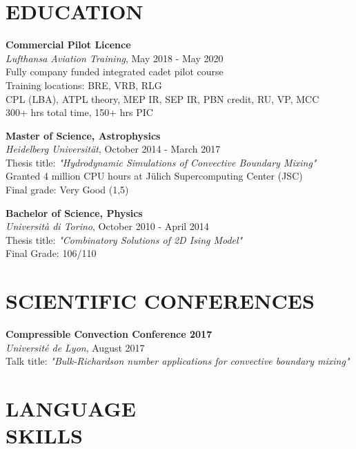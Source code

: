 \documentclass[margin]{res}
\begin{document}
\begin{resume}
\section{EDUCATION}

\textbf{Commercial Pilot Licence}\\
{\sl Lufthansa Aviation Training}, May 2018 - May 2020\\
Fully company funded integrated cadet pilot course\\
Training locations: BRE, VRB, RLG\\
CPL (LBA), ATPL theory, MEP IR, SEP IR, PBN credit, RU, VP, MCC\\
300+ hrs total time, 150+ hrs PIC

\textbf{Master of Science, Astrophysics}\\
{\sl Heidelberg Universität}, October 2014 - March 2017\\
Thesis title: \textit{"Hydrodynamic Simulations of Convective Boundary Mixing"}\\
Granted 4 million CPU hours at Jülich Supercomputing Center (JSC)\\
\hfill Final grade: Very Good (1,5)

\textbf{Bachelor of Science, Physics} \\
{\sl Università di Torino}, October 2010 - April 2014\\
Thesis title: \textit{"Combinatory Solutions of 2D Ising Model"}\\
\hfill Final Grade: 106/110
\section{SCIENTIFIC CONFERENCES}

\textbf{Compressible Convection Conference 2017}\\
{\sl Université de Lyon}, August 2017\\
Talk title: \textit{"Bulk-Richardson number applications for convective boundary mixing"}  

\bigskip

\pagebreak

\section{LANGUAGE\\SKILLS}


\end{resume}
\end{document}
